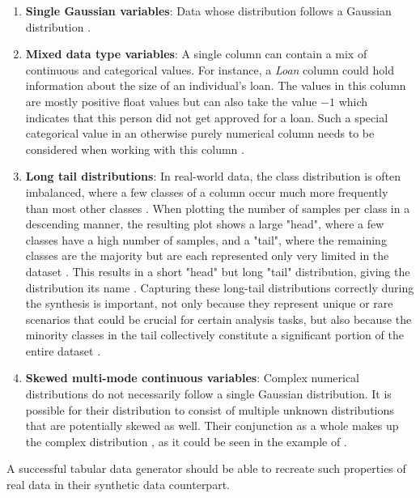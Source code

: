 \begin{enumerate}
    \item \textbf{Single Gaussian variables}: Data whose distribution follows a Gaussian distribution \cite{zhao2022CTABGANEnhancingTabular}.
    \item \textbf{Mixed data type variables}: A single column can contain a mix of continuous and categorical values. 
    For instance, a \textit{Loan} column could hold information about the size of an individual's loan.
    The values in this column are mostly positive float values but can also take the value \textit{$-1$} which indicates that this person did not get approved for a loan.
    Such a special categorical value in an otherwise purely numerical column needs to be considered when working with this column \cite{zhao2022CTABGANEnhancingTabular}.
    \item \textbf{Long tail distributions}: In real-world data, the class distribution is often imbalanced, where a few classes of a column occur much more frequently than most other classes \cite{zhang2023DeepLongTailedLearning}.
    When plotting the number of samples per class in a descending manner, the resulting plot shows a large "head", where a few classes have a high number of samples, and a "tail", where the remaining classes are the majority but are each represented only very limited in the dataset \cite[p. 2]{zhang2023DeepLongTailedLearning}.
    This results in a short "head" but long "tail" distribution, giving the distribution its name \cite{zhang2023DeepLongTailedLearning}.
    Capturing these long-tail distributions correctly during the synthesis is important, not only because they represent unique or rare scenarios that could be crucial for certain analysis tasks, but also because the minority classes in the tail collectively constitute a significant portion of the entire dataset \cite{zhou2018DeepSuperclassLearning}. 
    \item \textbf{Skewed multi-mode continuous variables}: Complex numerical distributions do not necessarily follow a single Gaussian distribution.
    It is possible for their distribution to consist of multiple unknown distributions that are potentially skewed as well. 
    Their conjunction as a whole makes up the complex distribution \cite{zhao2022CTABGANEnhancingTabular}, as it could be seen in the example of .
\end{enumerate}

A successful tabular data generator should be able to recreate such properties of real data in their synthetic data counterpart.


